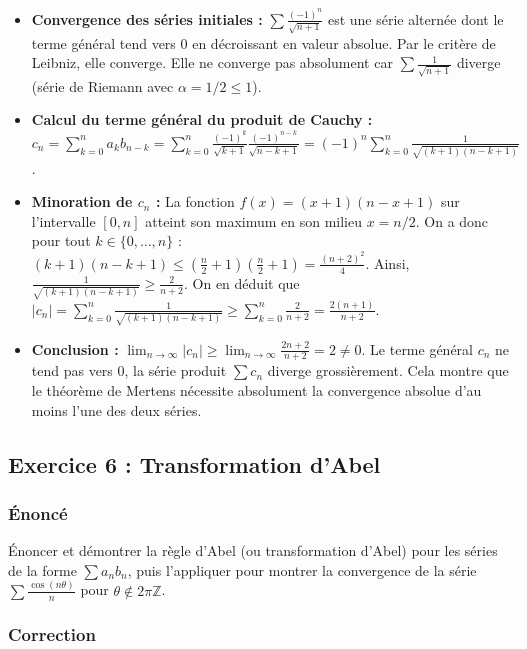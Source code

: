 \documentclass[12pt,a4paper]{report}
\begin{document}
\begin{itemize}
\item \textbf{Convergence des séries initiales :} $\sum \frac{(-1)^n}{\sqrt{n+1}}$ est une série alternée dont le terme général tend vers 0 en décroissant en valeur absolue. Par le critère de Leibniz, elle converge. Elle ne converge pas absolument car $\sum \frac{1}{\sqrt{n+1}}$ diverge (série de Riemann avec $\alpha=1/2 \le 1$).
\item \textbf{Calcul du terme général du produit de Cauchy :}
   $c_n = \sum_{k=0}^n a_k b_{n-k} = \sum_{k=0}^n \frac{(-1)^k}{\sqrt{k+1}} \frac{(-1)^{n-k}}{\sqrt{n-k+1}} = (-1)^n \sum_{k=0}^n \frac{1}{\sqrt{(k+1)(n-k+1)}}$.
\item \textbf{Minoration de $c_n$ :}
   La fonction $f(x) = (x+1)(n-x+1)$ sur l'intervalle $[0, n]$ atteint son maximum en son milieu $x = n/2$.
   On a donc pour tout $k \in \{0, \dots, n\}$ : $(k+1)(n-k+1) \le (\frac{n}{2} + 1)(\frac{n}{2} + 1) = \frac{(n+2)^2}{4}$.
   Ainsi, $\frac{1}{\sqrt{(k+1)(n-k+1)}} \ge \frac{2}{n+2}$.
   On en déduit que $|c_n| = \sum_{k=0}^n \frac{1}{\sqrt{(k+1)(n-k+1)}} \ge \sum_{k=0}^n \frac{2}{n+2} = \frac{2(n+1)}{n+2}$.
\item \textbf{Conclusion :}
   $\lim_{n\to\infty} |c_n| \ge \lim_{n\to\infty} \frac{2n+2}{n+2} = 2 \neq 0$.
   Le terme général $c_n$ ne tend pas vers 0, la série produit $\sum c_n$ diverge grossièrement. Cela montre que le théorème de Mertens nécessite absolument la convergence absolue d'au moins l'une des deux séries.
\end{itemize}


\subsection{Exercice 6 : Transformation d'Abel}

\subsubsection{Énoncé}
Énoncer et démontrer la règle d'Abel (ou transformation d'Abel) pour les séries de la forme $\sum a_n b_n$, puis l'appliquer pour montrer la convergence de la série $\sum \frac{\cos(n\theta)}{n}$ pour $\theta \notin 2\pi\mathbb{Z}$.

\subsubsection{Correction}
\end{document}
